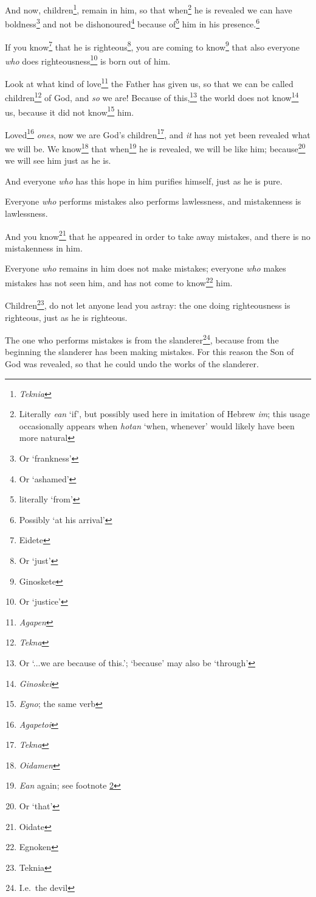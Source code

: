 \documentclass[article]{memoir}%
\newcounter{vnum}
\renewcommand*{\chapter}{
	\vspace{\baselineskip}
	\settowidth{\chapindent}{\chapnumfont 999}
	\noindent\llap{\makebox[\chapindent][l]{%
		\chapnumfont \thechapter}}%
	\addtocounter{chapter}{1}
	\setcounter{vnum}{1}
}
\newcommand{\vnum}{%
	\textsuperscript{\thevnum}%
	\addtocounter{vnum}{1}%
}
\newcommand{\infer}[1]{\textit{#1}}
\newcommand{\lx}[1]{\textit{#1}}
\newcommand{\lxx}[2]{\textit{#1} `#2'}
\begin{document}
\vnum And now, children\footnote{\lx{Teknia}}, remain in him, so that when\footnote{Literally \lxx{ean}{if}, but possibly used here in imitation of Hebrew \lx{im}; this usage occasionally appears when \lxx{hotan}{when, whenever} would likely have been more natural\label{eanwhen}} he is revealed we can have boldness\footnote{Or `frankness'} and not be dishonoured\footnote{Or `ashamed'} because of\footnote{literally `from'} him in his presence.\footnote{Possibly `at his arrival'} \vnum If you know\footnote{Eidete} that he is righteous\footnote{Or `just'}, you are coming to know\footnote{Ginoskete} that also everyone \infer{who} does righteousness\footnote{Or `justice'} is born out of him. %

\chapter{} \vnum Look at what kind of love\footnote{\lx{Agapen}} the Father has given us, so that we can be called children\footnote{\lx{Tekna}} of God, and \infer{so} we are! Because of this,\footnote{Or `...we are because of this.'; `because' may also be `through'} the world does not know\footnote{\lx{Ginoskei}} us, because it did not know\footnote{\lx{Egno}; the same verb} him. \vnum Loved\footnote{\lx{Agapetoi}} \infer{ones}, now we are God's children\footnote{\lx{Tekna}}, and \infer{it} has not yet been revealed what we will be. We know\footnote{\lx{Oidamen}} that when\footnote{\lx{Ean} again; see footnote \ref{eanwhen}} he is revealed, we will be like him; because\footnote{Or `that'} we will see him just as he is. \vnum And everyone \infer{who} has this hope in him purifies himself, just as he is pure.

\vnum Everyone \infer{who} performs mistakes also performs lawlessness, and mistakenness is lawlessness. \vnum And you know\footnote{Oidate} that he appeared in order to take away mistakes, and there is no mistakenness in him. \vnum Everyone \infer{who} remains in him does not make mistakes; everyone \infer{who} makes mistakes has not seen him, and has not come to know\footnote{Egnoken} him. \vnum Children\footnote{Teknia}, do not let anyone lead you astray: the one doing righteousness is righteous, just as he is righteous. \vnum The one who performs mistakes is from the slanderer\footnote{I.e.\ the devil}, because from the beginning the slanderer has been making mistakes. For this reason the Son of God was revealed, so that he could undo the works of the slanderer.
\end{document}
